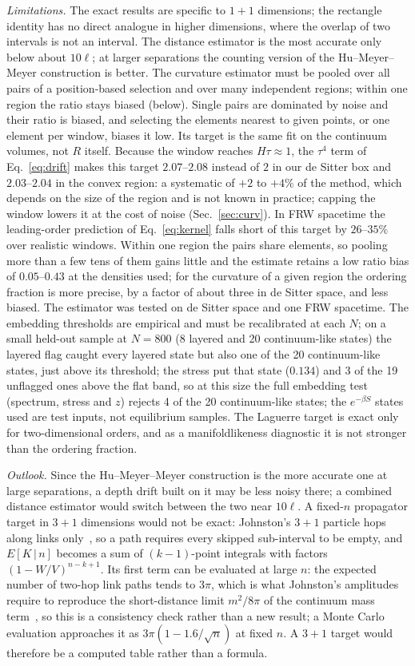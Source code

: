 \documentclass[prd,twocolumn,superscriptaddress,nofootinbib,amsmath,amssymb,floatfix]{revtex4-2}
\begin{document}
\emph{Limitations.} The exact results are specific to $1+1$ dimensions; the rectangle identity has no direct analogue in higher dimensions, where the overlap of two intervals is not an interval. The distance estimator is the most accurate only below about $10\ell$; at larger separations the counting version of the Hu--Meyer--Meyer construction is better. The curvature estimator must be pooled over all pairs of a position-based selection and over many independent regions; within one region the ratio stays biased (below). Single pairs are dominated by noise and their ratio is biased, and selecting the elements nearest to given points, or one element per window, biases it low. Its target is the same fit on the continuum volumes, not $R$ itself. Because the window reaches $H\tau\approx1$, the $\tau^4$ term of Eq.~\eqref{eq:drift} makes this target $2.07$--$2.08$ instead of $2$ in our de Sitter box and $2.03$--$2.04$ in the convex region: a systematic of $+2$ to $+4\%$ of the method, which depends on the size of the region and is not known in practice; capping the window lowers it at the cost of noise (Sec.~\ref{sec:curv}). In FRW spacetime the leading-order prediction of Eq.~\eqref{eq:kernel} falls short of this target by $26$--$35\%$ over realistic windows. Within one region the pairs share elements, so pooling more than a few tens of them gains little and the estimate retains a low ratio bias of $0.05$--$0.43$ at the densities used; for the curvature of a given region the ordering fraction is more precise, by a factor of about three in de Sitter space, and less biased. The estimator was tested on de Sitter space and one FRW spacetime. The embedding thresholds are empirical and must be recalibrated at each $N$; on a small held-out sample at $N=800$ (8 layered and 20 continuum-like states) the layered flag caught every layered state but also one of the 20 continuum-like states, just above its threshold; the stress put that state ($0.134$) and 3 of the 19 unflagged ones above the flat band, so at this size the full embedding test (spectrum, stress and $z$) rejects 4 of the 20 continuum-like states; the $e^{-\beta S}$ states used are test inputs, not equilibrium samples. The Laguerre target is exact only for two-dimensional orders, and as a manifoldlikeness diagnostic it is not stronger than the ordering fraction.

\emph{Outlook.} Since the Hu--Meyer--Meyer construction is the more accurate one at large separations, a depth drift built on it may be less noisy there; a combined distance estimator would switch between the two near $10\ell$. A fixed-$n$ propagator target in $3+1$ dimensions would not be exact: Johnston's $3+1$ particle hops along links only~\cite{Johnston08}, so a path requires every skipped sub-interval to be empty, and $E[K\,|\,n]$ becomes a sum of $(k-1)$-point integrals with factors $(1-W/V)^{n-k+1}$. Its first term can be evaluated at large $n$: the expected number of two-hop link paths tends to $3\pi$, which is what Johnston's amplitudes require to reproduce the short-distance limit $m^2/8\pi$ of the continuum mass term~\cite{Johnston08}, so this is a consistency check rather than a new result; a Monte Carlo evaluation approaches it as $3\pi(1-1.6/\sqrt n)$ at fixed $n$. A $3+1$ target would therefore be a computed table rather than a formula.
\end{document}

